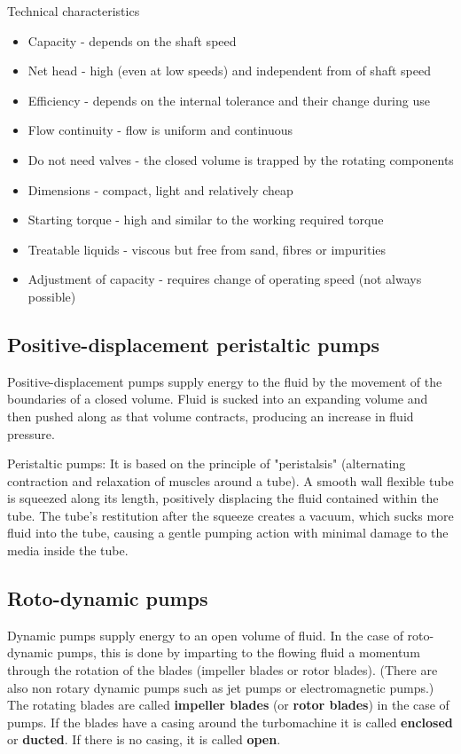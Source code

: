 \documentclass[class=report, crop=false, 12pt,a4paper]{standalone}
\begin{document}
Technical characteristics
\begin{itemize}
  \item Capacity - depends on the shaft speed
  \item Net head - high (even at low speeds) and independent from of shaft speed
  \item Efficiency - depends on the internal tolerance and their change during use
  \item Flow continuity - flow is uniform and continuous
  \item Do not need valves - the closed volume is trapped by the rotating components
  \item Dimensions - compact, light and relatively cheap
  \item Starting torque - high and similar to the working required torque
  \item Treatable liquids - viscous but free from sand, fibres or impurities
  \item Adjustment of capacity - requires change of operating speed (not always possible)
\end{itemize}
\subsection{Positive-displacement peristaltic pumps}
Positive-displacement pumps supply energy to the fluid by the movement of the boundaries of a closed volume. Fluid is sucked into an expanding volume and then pushed along as that volume contracts, producing an increase in fluid pressure.

Peristaltic pumps: It is based on the principle of "peristalsis" (alternating contraction and relaxation of muscles around a tube). A smooth wall flexible tube is squeezed along its length, positively displacing the fluid contained within the tube. The tube's restitution after the squeeze creates a vacuum, which sucks more fluid into the tube, causing a gentle pumping action with minimal damage to the media inside the tube.
\subsection{Roto-dynamic pumps}
Dynamic pumps supply energy to an open volume of fluid. In the case of roto-dynamic pumps, this is done by imparting to the flowing fluid a momentum through the rotation of the blades (impeller blades or rotor blades). (There are also non rotary dynamic pumps such as jet pumps or electromagnetic pumps.) The rotating blades are called \textbf{impeller blades} (or \textbf{rotor blades}) in the case of pumps. If the blades have a casing around the turbomachine it is called \textbf{enclosed} or \textbf{ducted}. If there is no casing, it is called \textbf{open}. 
\end{document}
